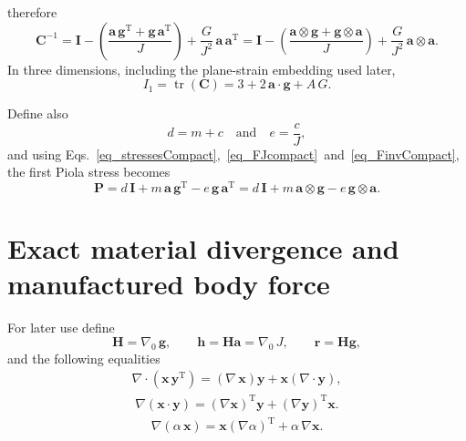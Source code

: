 \documentclass[11pt,a4paper]{article}
\newcommand{\Grad}{\nabla}
\newcommand{\tr}{\operatorname{tr}}
\newcommand{\Id}{\textbf{I}}
\begin{document}
%
therefore
%
\begin{equation}
\boxed{
\textbf{C}^{-1}=
\Id -\left( \dfrac{\textbf{a}\,\textbf{g}^\text{T}+\textbf{g}\,\textbf{a}^\text{T}}{J}\right) +\dfrac{G}{J^2}\,\textbf{a}\,\textbf{a}^\text{T}=\Id
-\left( \dfrac{\textbf{a}\otimes\textbf{g}+\textbf{g}\otimes\textbf{a}}{J}\right) 
+\dfrac{G}{J^2}\,\textbf{a}\otimes\textbf{a}
}.
\label{eq_CinvCompact}
\end{equation}
%
In three dimensions, including the plane-strain embedding used later,
%
\begin{equation}
\boxed{
I_1=\tr(\textbf{C})=3+2\,\textbf{a}\cdot\textbf{g}+A\,G
}.
\label{eq_I1compact}
\end{equation}

Define also
\begin{equation}
\boxed{
d=m+c\quad\text{and}
\quad
e=\dfrac{c}{J}
},
\label{eq_de}
\end{equation}
%
and using Eqs.~\eqref{eq_stressesCompact},~\eqref{eq_FJcompact}~and~\eqref{eq_FinvCompact}, the first Piola stress becomes
%
\begin{equation}
\boxed{
\textbf{P}
=d\,\Id+m\,\textbf{a}\,\textbf{g}^\text{T}
-e\,\textbf{g}\,\textbf{a}^\text{T}=d\,\Id+m\,\textbf{a}\otimes\textbf{g}
-e\,\textbf{g}\otimes\textbf{a}
}.
\label{eq_PcompactRankOne}
\end{equation}

\section{Exact material divergence and manufactured body force}

For later use define
%
\begin{equation}
\boxed{\textbf{H}=\Grad_0\,\textbf{g},
\qquad
\textbf{h}=\textbf{H}\textbf{a}=\Grad_0\, J,
\qquad
\textbf{r}=\textbf{H}\textbf{g}},
\end{equation}
% 
and the following equalities
%
\begin{eqnarray}
\boxed{\Grad\cdot (\textbf{x}\,\textbf{y}^\text{T})=\left(\Grad\,\textbf{x}\right)\textbf{y}+\textbf{x}\left(\Grad\cdot\textbf{y} \right)},
\end{eqnarray}
%
\begin{eqnarray}
\boxed{\Grad(\textbf{x}\cdot\textbf{y})= \left( \Grad \textbf{x}\right)^\text{T}\textbf{y}+\left(\Grad\textbf{y} \right)^\text{T}\textbf{x}}.
\end{eqnarray}
%
\begin{eqnarray}
	\boxed{\Grad(\alpha\,\textbf{x})= \textbf{x}\left( \Grad \alpha\right)^\text{T}+\alpha\,\Grad\textbf{x}}.
\end{eqnarray}
\end{document}
